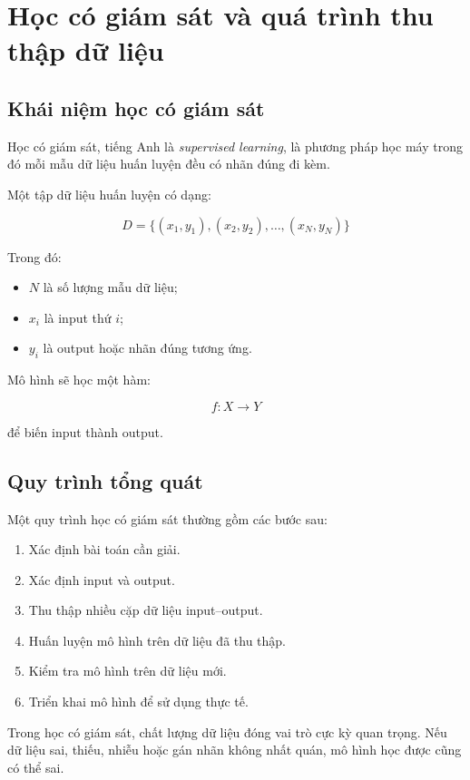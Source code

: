 \documentclass[12pt,a4paper]{report}
\begin{document}
\chapter{Học có giám sát và quá trình thu thập dữ liệu}

\section{Khái niệm học có giám sát}

Học có giám sát, tiếng Anh là \textit{supervised learning}, là phương pháp học máy trong đó mỗi mẫu dữ liệu huấn luyện đều có nhãn đúng đi kèm.

Một tập dữ liệu huấn luyện có dạng:

\[
    D = \{(x_1,y_1), (x_2,y_2), \ldots, (x_N,y_N)\}
\]

Trong đó:

\begin{itemize}
    \item $N$ là số lượng mẫu dữ liệu;
    \item $x_i$ là input thứ $i$;
    \item $y_i$ là output hoặc nhãn đúng tương ứng.
\end{itemize}

Mô hình sẽ học một hàm:

\[
    f: X \rightarrow Y
\]

để biến input thành output.

\section{Quy trình tổng quát}

Một quy trình học có giám sát thường gồm các bước sau:

\begin{enumerate}
    \item Xác định bài toán cần giải.
    \item Xác định input và output.
    \item Thu thập nhiều cặp dữ liệu input--output.
    \item Huấn luyện mô hình trên dữ liệu đã thu thập.
    \item Kiểm tra mô hình trên dữ liệu mới.
    \item Triển khai mô hình để sử dụng thực tế.
\end{enumerate}

\begin{ghinho}
Trong học có giám sát, chất lượng dữ liệu đóng vai trò cực kỳ quan trọng. Nếu dữ liệu sai, thiếu, nhiễu hoặc gán nhãn không nhất quán, mô hình học được cũng có thể sai.
\end{ghinho}
\end{document}
